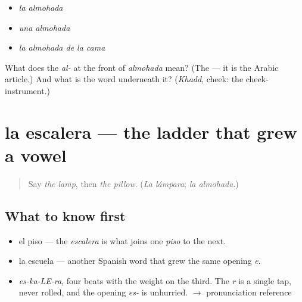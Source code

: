 \begin{itemize}
\raggedright
  \item \emph{la almohada}
  \item \emph{una almohada}
  \item \emph{la almohada de la cama}
\end{itemize}

\begin{tcolorbox}[breakable,colback=teal!4,colframe=teal!35!black,title={Before you move on}]
What does the \emph{al-} at the front of \emph{almohada} mean? (The — it is the Arabic article.) And what is the word underneath it? (\emph{Khadd}, cheek: the cheek-instrument.)
\end{tcolorbox}
\section[la escalera]{la escalera — the ladder that grew a vowel}

\label{lesson:ES-C366-escalera}



\begin{quote}
Say \emph{the lamp}, then \emph{the pillow}. (\emph{La lámpara}; \emph{la almohada}.)
\end{quote}

\subsection*{What to know first}
\begin{itemize}
\raggedright
  \item el piso — the \emph{escalera} is what joins one \emph{piso} to the next.
  \item la escuela — another Spanish word that grew the same opening \emph{e}.
\end{itemize}

\begin{sounds}
\begin{itemize}
\raggedright
  \item \emph{es-ka-LE-ra}, four beats with the weight on the third. The \emph{r} is a single tap, never rolled, and the opening \emph{es-} is unhurried. $\to$ pronunciation reference
\end{itemize}
\end{sounds}

